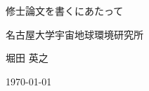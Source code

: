 \documentclass[a4paper,11pt,oneside]{ltjsbook}
\begin{document}
\frontmatter
\thispagestyle{empty}
\vspace*{5\zw}
\begin{center}
  {\LARGE 修士論文を書くにあたって\par}
  \vspace{2\zw}
  {\large 名古屋大学宇宙地球環境研究所\par}
  \vspace{0.5\zw}
  {\large 堀田 英之\par}
  \vspace{1\zw}
  {\large \today\par}
\end{center}
\clearpage

\tableofcontents

\mainmatter


\ifdefined\BibStyleBiblatex
  \printbibliography[title={引用文献}]
\else
  \renewcommand{\bibname}{引用文献}
  
  
\fi
\end{document}
